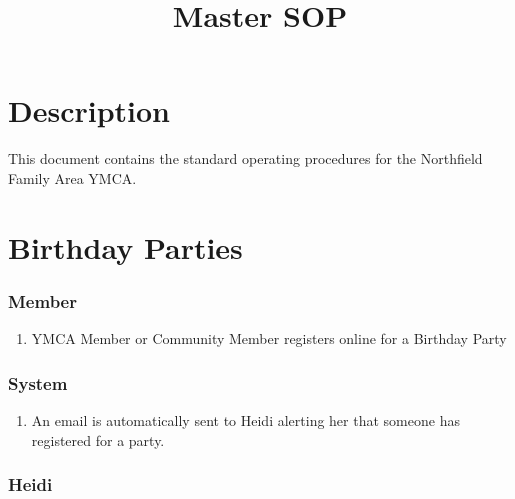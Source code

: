 \documentclass[
]{report}
\title{Master SOP}
\author{}
\date{}
\providecommand{\tightlist}{%
  \setlength{\itemsep}{0pt}\setlength{\parskip}{0pt}}\usepackage{longtable,booktabs,array}
\begin{document}
\maketitle
\ifdefined\Shaded\renewenvironment{Shaded}{\begin{tcolorbox}[enhanced, sharp corners, borderline west={3pt}{0pt}{shadecolor}, interior hidden, breakable, boxrule=0pt, frame hidden]}{\end{tcolorbox}}\fi

\hypertarget{description}{%
\section{Description}\label{description}}

This document contains the standard operating procedures for the
Northfield Family Area YMCA.

\hypertarget{birthday-parties}{%
\section{Birthday Parties}\label{birthday-parties}}

\hypertarget{member}{%
\subsubsection{Member}\label{member}}

\begin{enumerate}
\def\labelenumi{\arabic{enumi}.}
\tightlist
\item
  YMCA Member or Community Member registers online for a Birthday Party
\end{enumerate}

\hypertarget{system}{%
\subsubsection{System}\label{system}}

\begin{enumerate}
\def\labelenumi{\arabic{enumi}.}
\setcounter{enumi}{1}
\tightlist
\item
  An email is automatically sent to Heidi alerting her that someone has
  registered for a party.
\end{enumerate}

\hypertarget{heidi}{%
\subsubsection{Heidi}\label{heidi}}
\end{document}
